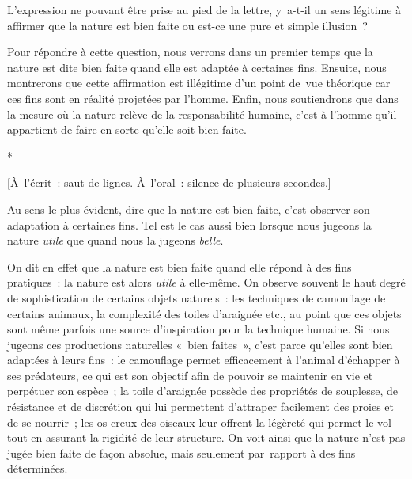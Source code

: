 \documentclass[a4paper,12pt]{article}
\begin{document}
L'expression ne pouvant être prise au pied de
la lettre, y a-t-il un sens légitime à affirmer que la nature est bien
faite ou est-ce une pure et simple illusion ?

Pour répondre à cette question, nous verrons dans un
premier temps que la nature est dite bien faite quand elle est adaptée à
certaines fins. Ensuite, nous montrerons que cette affirmation est
illégitime d'un point de vue théorique car ces fins sont en réalité
projetées par l'homme. Enfin, nous soutiendrons que dans la mesure où la
nature relève de la responsabilité humaine, c'est à l'homme qu'il
appartient de faire en sorte qu'elle soit bien faite.

\begin{center}
*

[À l'écrit : saut de lignes. À l'oral : silence de plusieurs secondes.]
\end{center}

Au sens le plus évident, dire que la
nature est bien faite, c'est observer son adaptation à certaines fins.
Tel est le cas aussi bien lorsque nous jugeons la nature \emph{utile} que
quand nous la jugeons \emph{belle}​.

On dit en effet que la nature est bien faite
quand elle répond à des fins pratiques : la nature est alors \emph{utile}​ à
elle-même. On observe souvent le haut degré de sophistication de
certains objets naturels : les techniques de
camouflage de certains animaux, la complexité des toiles d'araignée
etc., au point que ces objets sont même parfois une source d'inspiration
pour la technique humaine. Si nous jugeons ces productions naturelles
« bien faites », c'est parce qu'elles sont bien adaptées à leurs fins :
le camouflage permet efficacement à l'animal d'échapper à ses
prédateurs, ce qui est son objectif afin de pouvoir se maintenir en vie
et perpétuer son espèce ; la toile d'araignée possède des propriétés de
souplesse, de résistance et de discrétion qui lui permettent d'attraper
facilement des proies et de se nourrir ; les os creux des oiseaux leur
offrent la légèreté qui permet le vol tout en assurant la rigidité de
leur structure. On voit ainsi que
la nature n'est pas jugée bien faite de façon absolue, mais seulement
par rapport à des fins déterminées.
\end{document}
